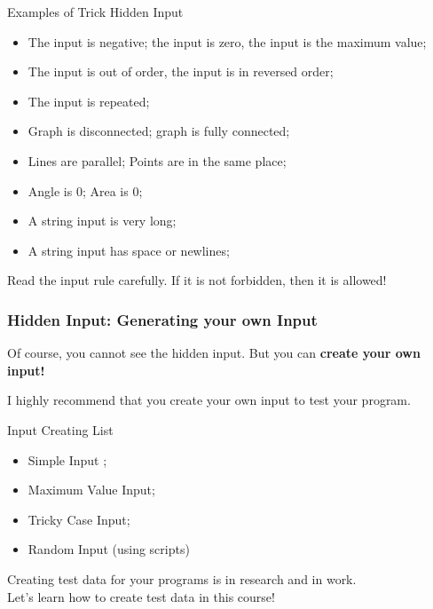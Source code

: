 \begin{frame}{Examples of Trick Hidden Input}

    \begin{itemize}
      \item The input is negative; the input is zero, the input is the maximum value;
      \item The input is out of order, the input is in reversed order;
      \item The input is repeated;\medskip

      \item Graph is disconnected; graph is fully connected;
      \item Lines are parallel; Points are in the same place;
      \item Angle is 0; Area is 0;\medskip

      \item A string input is very long;
      \item A string input has space or newlines;
    \end{itemize}

    \begin{block}{}
      Read the input rule carefully. If it is not forbidden, then it is allowed!
    \end{block}
\end{frame}

\begin{frame}
  \frametitle{Hidden Input: Generating your own Input}

  Of course, you cannot see the hidden input. But you can {\bf create your own input!}\medskip

  I highly recommend that you create your own input to test your program.\medskip

  \begin{exampleblock}{Input Creating List}
    \begin{itemize}
      \item Simple Input ;
      \item Maximum Value Input;
      \item Tricky Case Input;
      \item Random Input (using scripts)
    \end{itemize}
  \end{exampleblock}

  Creating test data for your programs is in research and in work.\\
  Let's learn how to create test data in this course!
\end{frame}

